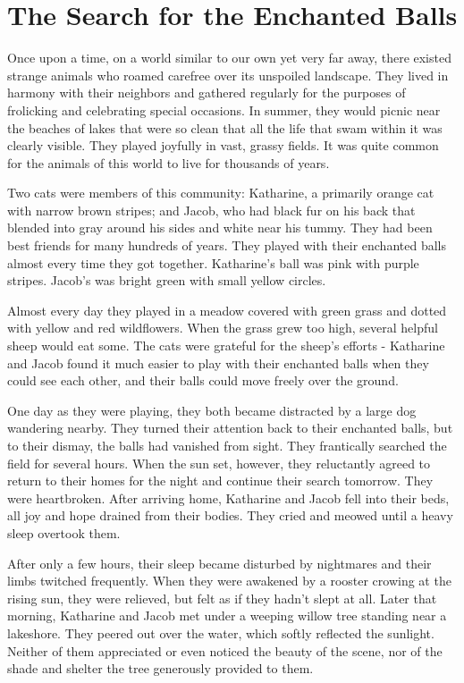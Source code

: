 \chapter{The Search for the Enchanted Balls}

Once upon a time, on a world similar to our own yet very far away, there existed strange animals who roamed carefree over its unspoiled landscape. They lived in harmony with their neighbors and gathered regularly for the purposes of frolicking and celebrating special occasions. In summer, they would picnic near the beaches of lakes that were so clean that all the life that swam within it was clearly visible. They played joyfully in vast, grassy fields. It was quite common for the animals of this world to live for thousands of years.

Two cats were members of this community: Katharine, a primarily orange cat with narrow brown stripes; and Jacob, who had black fur on his back that blended into gray around his sides and white near his tummy. They had been best friends for many hundreds of years. They played with their enchanted balls almost every time they got together. Katharine's ball was pink with purple stripes. Jacob's was bright green with small yellow circles.

Almost every day they played in a meadow covered with green grass and dotted with yellow and red wildflowers. When the grass grew too high, several helpful sheep would eat some. The cats were grateful for the sheep’s efforts - Katharine and Jacob found it much easier to play with their enchanted balls when they could see each other, and their balls could move freely over the ground.

One day as they were playing, they both became distracted by a large dog wandering nearby. They turned their attention back to their enchanted balls, but to their dismay, the balls had vanished from sight. They frantically searched the field for several hours. When the sun set, however, they reluctantly agreed to return to their homes for the night and continue their search tomorrow. They were heartbroken. After arriving home, Katharine and Jacob fell into their beds, all joy and hope drained from their bodies. They cried and meowed until a heavy sleep overtook them.

After only a few hours, their sleep became disturbed by nightmares and their limbs twitched frequently. When they were awakened by a rooster crowing at the rising sun, they were relieved, but felt as if they hadn't slept at all. Later that morning, Katharine and Jacob met under a weeping willow tree standing near a lakeshore. They peered out over the water, which softly reflected the sunlight. Neither of them appreciated or even noticed the beauty of the scene, nor of the shade and shelter the tree generously provided to them.

